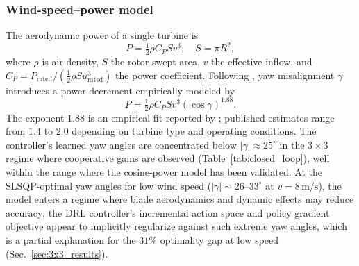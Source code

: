 \documentclass[final,5p,times]{elsarticle}
\begin{document}
\subsubsection{Wind-speed--power model}
The aerodynamic power of a single turbine is
\begin{equation}
P = \tfrac{1}{2}\rho C_P S v^3,\quad S=\pi R^2,
\label{eq:power_base}
\end{equation}
where $\rho$ is air density, $S$ the rotor-swept area, $v$ the effective inflow, and $C_P=P_\mathrm{rated}/(\tfrac{1}{2}\rho S u_\mathrm{rated}^3)$ the power coefficient. Following \citep{Cai2018}, yaw misalignment $\gamma$ introduces a power decrement empirically modeled by
\begin{equation}
P = \tfrac{1}{2}\rho C_P S v^3 (\cos\gamma)^{1.88}.
\label{eq:power_yaw}
\end{equation}
The exponent $1.88$ is an empirical fit reported by \citet{Cai2018}; published estimates range from $1.4$ to $2.0$ depending on turbine type and operating conditions. The controller's learned yaw angles are concentrated below $|\gamma|\!\approx\!25^\circ$ in the $3\!\times\!3$ regime where cooperative gains are observed (Table~\ref{tab:closed_loop}), well within the range where the cosine-power model has been validated. At the SLSQP-optimal yaw angles for low wind speed ($|\gamma|\!\sim\!26$--$33^\circ$ at $v\!=\!8\,\mathrm{m/s}$), the model enters a regime where blade aerodynamics and dynamic effects may reduce accuracy; the DRL controller's incremental action space and policy gradient objective appear to implicitly regularize against such extreme yaw angles, which is a partial explanation for the $31\%$ optimality gap at low speed (Sec.~\ref{sec:3x3_results}).
\end{document}
